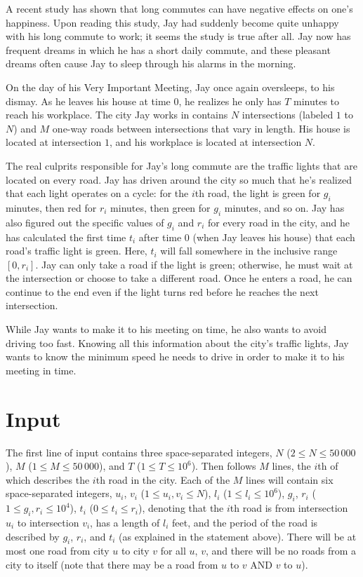 
A recent study has shown that long commutes can have negative effects on one's happiness. Upon reading
this study, Jay had suddenly become quite unhappy with his long commute to work; it seems the study is
true after all. Jay now has frequent dreams in which he has a short daily commute, and these pleasant
dreams often cause Jay to sleep through his alarms in the morning.

On the day of his Very Important Meeting, Jay once again oversleeps, to his dismay. As he leaves his house
at time $0$, he realizes he only has $T$ minutes to reach his workplace. The city Jay works in contains
$N$ intersections (labeled $1$ to $N$) and $M$ one-way roads between intersections that vary in length.
His house is located at intersection $1$, and his workplace is located at intersection $N$.

The real culprits responsible for Jay's long commute are the traffic lights that are located on every road.
Jay has driven around the city so much that he's realized that each light operates on a cycle: for the $i$th
road, the light is green for $g_i$ minutes, then red for $r_i$ minutes, then green for $g_i$ minutes, and so 
on. Jay has also figured out the specific values of $g_i$ and $r_i$ for every road in the city, and he has
calculated the first time $t_i$ after time $0$ (when Jay leaves his house) that each road's traffic light is
green. Here, $t_i$ will fall somewhere in the inclusive range $[0, r_i]$. Jay can only take a road if the
light is green; otherwise, he must wait at the intersection or choose to take a different road. Once he
enters a road, he can continue to the end even if the light turns red before he reaches the next
intersection.

While Jay wants to make it to his meeting on time, he also wants to avoid driving too fast. Knowing all
this information about the city's traffic lights, Jay wants to know the minimum speed he needs to drive
in order to make it to his meeting in time.

\section*{Input}

The first line of input contains three space-separated integers, $N$ ($2 \leq N \leq 50\,000$), $M$
($1 \leq M \leq 50\,000$), and $T$ ($1 \leq T \leq 10^6$). Then follows $M$ lines, the $i$th of which
describes the $i$th road in the city. Each of the $M$ lines will contain six space-separated integers,
$u_i$, $v_i$ ($1 \leq u_i, v_i \leq N$), $l_i$ ($1 \leq l_i \leq 10^6$), $g_i$, $r_i$
($1 \leq g_i, r_i \leq 10^4$), $t_i$ ($0 \leq t_i \leq r_i$), denoting that the $i$th road is from
intersection $u_i$ to intersection $v_i$, has a length of $l_i$ feet, and the period of the road is
described by $g_i$, $r_i$, and $t_i$ (as explained in the statement above). There will be at most one road
from city $u$ to city $v$ for all $u$, $v$, and there will be no roads from a city to itself (note that
there may be a road from $u$ to $v$ AND $v$ to $u$).


